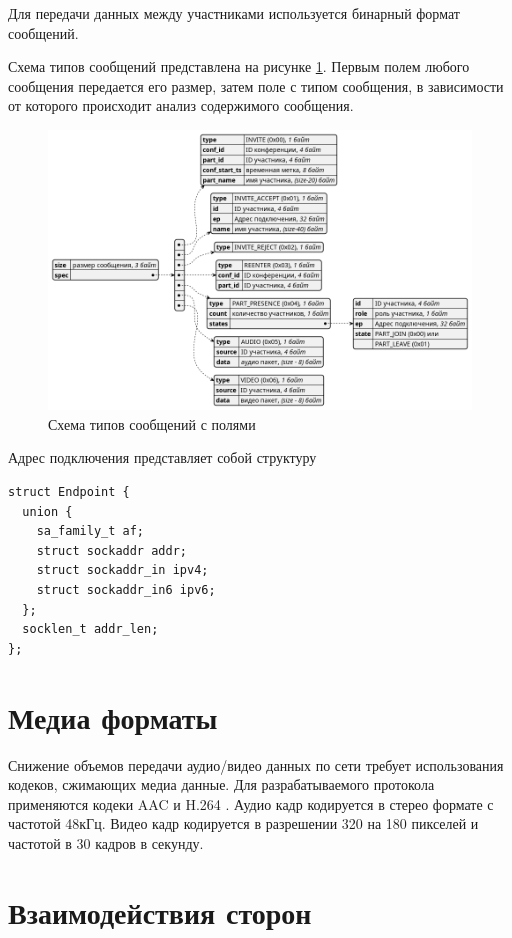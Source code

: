 Для передачи данных между участниками используется бинарный формат сообщений.

Схема типов сообщений представлена на рисунке \ref{img:msg-types}.
Первым полем любого сообщения передается его размер, затем поле с типом сообщения, в зависимости от которого происходит анализ содержимого сообщения.
\begin{figure}[H]
  \centering
  \includegraphics[width=\linewidth]{inc/diag/msg-types/msg-types.png}
  \caption{Схема типов сообщений с полями}
  \label{img:msg-types}
\end{figure}

Адрес подключения представляет собой структуру
\begin{verbatim}
struct Endpoint {
  union {
    sa_family_t af;
    struct sockaddr addr;
    struct sockaddr_in ipv4;
    struct sockaddr_in6 ipv6;
  };
  socklen_t addr_len;
};
\end{verbatim}

\section{Медиа форматы}

Снижение объемов передачи аудио/видео данных по сети требует использования кодеков, сжимающих медиа данные. Для разрабатываемого протокола применяются кодеки AAC \cite{aac} и H.264 \cite{h264}. Аудио кадр кодируется в стерео формате с частотой 48кГц. Видео кадр кодируется в разрешении 320 на 180 пикселей и частотой в 30 кадров в секунду.

\section{Взаимодействия сторон}


